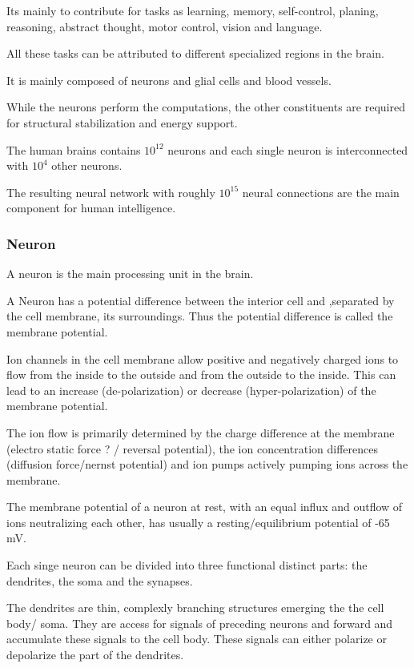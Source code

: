 Its mainly to contribute for tasks as learning, memory, self-control, planing, reasoning, abstract thought, motor control, vision and language.

All these tasks can be attributed to different specialized regions in the brain. 

It is mainly composed of neurons and glial cells and blood vessels.

While the neurons perform the computations, the other constituents are required for structural stabilization and energy support.

The human brains contains $10^{12}$ neurons and each single neuron is interconnected with $10^{4}$ other neurons.

The resulting neural network with roughly $10^{15}$ neural connections are the main component for human intelligence.

\subsubsection{Neuron}


A neuron is the main processing unit in the brain.

A Neuron has a potential difference between the interior cell and ,separated by the cell membrane, its surroundings. 
Thus the potential difference is called the membrane potential.

Ion channels in the cell membrane allow positive and negatively charged ions to flow from the inside to the outside and from the outside to the inside.
This can lead to an increase (de-polarization) or decrease (hyper-polarization) of the membrane potential.

The ion flow is primarily determined by the charge difference at the membrane (electro static force ? / reversal potential), the ion concentration differences (diffusion force/nernst potential) and ion pumps actively pumping ions across the membrane.

The membrane potential of a neuron at rest, with an equal influx and outflow of ions neutralizing each other, has usually a resting/equilibrium potential of -65 mV. 

Each singe neuron can be divided into three functional distinct parts: the dendrites, the soma and the synapses.

The dendrites are thin, complexly branching structures emerging the the cell body/ soma.
They are access for signals of preceding neurons and forward and accumulate these signals to the cell body. 
These signals can either polarize or depolarize the part of the dendrites. 

